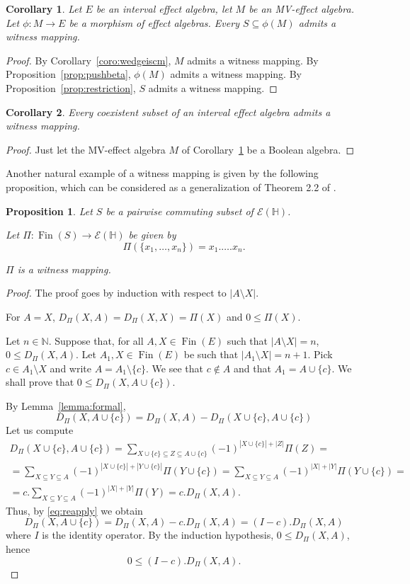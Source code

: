 \documentclass[letterpaper]{amsart}
\newtheorem{corollary}{Corollary}
\newtheorem{proposition}{Proposition}
\theoremstyle{definition}
\DeclareMathOperator*\Fin{Fin}
\begin{document}
\begin{corollary}
\label{coro:mvrange}
Let $E$ be an interval effect algebra,
let $M$ be an MV-effect algebra. Let $\phi:M\to E$ be a morphism of effect algebras.
Every $S\subseteq \phi(M)$ admits a witness mapping.
\end{corollary}
\begin{proof}
By 
Corollary~\ref{coro:wedgeiscm}, $M$ admits a witness mapping.
By Proposition~\ref{prop:pushbeta}, $\phi(M)$ admits a witness mapping.
By Proposition~\ref{prop:restriction}, $S$ admits a witness mapping.
\end{proof}
\begin{corollary}\label{coro:coexwitness}
Every coexistent subset of an interval effect algebra admits a witness mapping.
\end{corollary}
\begin{proof}
Just let the MV-effect algebra $M$ of Corollary~\ref{coro:mvrange} be a Boolean algebra.
\end{proof}
Another natural example of a witness mapping is given by the following proposition,
which can be considered as a generalization of Theorem 2.2 of \cite{Gud:CoQE}.
\begin{proposition}\label{prop:prodiswitness}
Let $S$ be a pairwise commuting subset of $\mathcal E(\mathbb H)$.

Let $\Pi:\Fin(S)\to \mathcal E(\mathbb H)$ be 
given by
$$
\Pi(\{x_1,\dots,x_n\})=x_1.\dots.x_n.
$$

$\Pi$ is a witness mapping.
\end{proposition}
\begin{proof}
The proof goes by induction with respect to
$|A\setminus X|$.

For $A=X$, $D_\Pi(X,A)=D_\Pi(X,X)=\Pi(X)$ and $0\leq\Pi(X)$.

Let $n\in\mathbb N$.
Suppose that, for all $A,X\in\Fin(E)$
such that $|A\setminus X|=n$, $0\leq D_\Pi(X,A)$. 
Let $A_1,X\in\Fin(E)$ be such that 
$|A_1\setminus X|=n+1$. Pick $c\in A_1\setminus X$ and
write $A=A_1\setminus\{c\}$. We see that $c\notin A$ and
that $A_1=A\cup\{c\}$.
We shall prove that $0\leq D_\Pi(X,A\cup\{c\})$.

By Lemma~\ref{lemma:formal},
\begin{equation}\label{eq:reapply}
D_\Pi(X,A\cup\{c\})=D_\Pi(X,A)-D_\Pi(X\cup\{c\},A\cup\{c\})
\end{equation}
Let us compute
\begin{align*}
D_\Pi(X\cup\{c\},A\cup\{c\})=
\sum_{X\cup\{c\}\subseteq Z\subseteq A\cup\{c\}}(-1)^{|X\cup\{c\}|+|Z|}\Pi(Z)=\\
=\sum_{X\subseteq Y\subseteq A}(-1)^{|X\cup\{c\}|+|Y\cup\{c\}|}\Pi(Y\cup\{c\})=
\sum_{X\subseteq Y\subseteq A}(-1)^{|X|+|Y|}\Pi(Y\cup\{c\})=\\
=c.\sum_{X\subseteq Y\subseteq A}(-1)^{|X|+|Y|}\Pi(Y)=c.D_\Pi(X,A).
\end{align*}
Thus, by \ref{eq:reapply} we obtain
$$
D_\Pi(X,A\cup\{c\})=D_\Pi(X,A)-c.D_\Pi(X,A)=(I-c).D_\Pi(X,A)
$$
where $I$ is the identity operator.
By the induction hypothesis, $0\leq D_\Pi(X,A)$,
hence 
$$
0\leq (I-c).D_\Pi(X,A).
$$
\end{proof}
\end{document}

